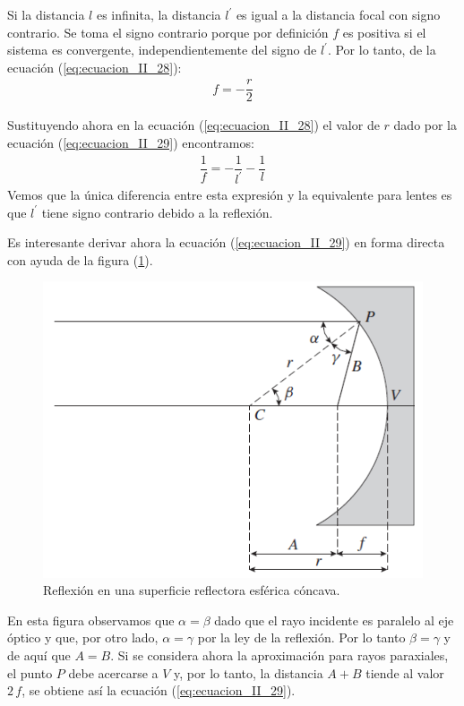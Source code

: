 \documentclass[14pt]{extarticle}
\begin{document}
Si la distancia $l$ es infinita, la distancia $l^{\prime}$ es igual a la distancia focal con signo
contrario. Se toma el signo contrario porque por definición $f$ es positiva si el sistema es convergente, independientemente del signo de $l^{\prime}$. Por lo tanto, de la ecuación (\ref{eq:ecuacion_II_28}):
\begin{align}
f = - \dfrac{r}{2}
\label{eq:ecuacion_II_29}
\end{align}

Sustituyendo ahora en la ecuación (\ref{eq:ecuacion_II_28}) el valor de $r$ dado por la ecuación (\ref{eq:ecuacion_II_29}) encontramos:
\begin{align}
\dfrac{1}{f} = - \dfrac{1}{l^{\prime}} - \dfrac{1}{l}
\label{eq:ecuacion_II_30}
\end{align}
Vemos que la única diferencia entre esta expresión y la equivalente para lentes es que $l^{\prime}$ tiene signo contrario debido a la reflexión.

Es interesante derivar ahora la ecuación (\ref{eq:ecuacion_II_29}) en forma directa con ayuda de la
figura (\ref{fig:figura_II_11}).
\begin{figure}[H]
    \centering
    \includegraphics[scale=0.8]{Imagenes/Lentes_12.png}
    \caption{Reflexión en una superficie reflectora esférica cóncava.}
    \label{fig:figura_II_11}
\end{figure}
En esta figura observamos que $\alpha = \beta$ dado que el rayo incidente es paralelo al eje óptico y que, por otro lado, $\alpha = \gamma$ por la ley de la reflexión. Por lo tanto $\beta = \gamma$ y
de aquí que $A = B$. Si se considera ahora la aproximación para rayos paraxiales, el punto $P$ debe acercarse a $V$ y, por lo tanto, la distancia $A + B$ tiende al valor $2 \, f$, se obtiene así la ecuación (\ref{eq:ecuacion_II_29}).
\end{document}
